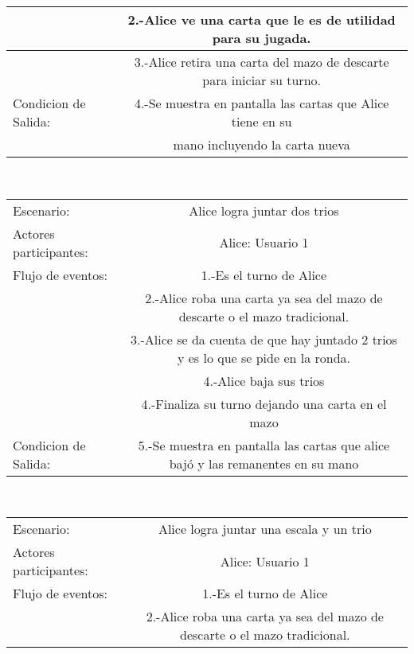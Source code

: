 \begin{center}
\begin{tabular}{ l | c  }
                                         & 2.-Alice ve una carta que le es de utilidad para su jugada. \\\hline
                                         & 3.-Alice retira una carta del mazo de descarte para iniciar su turno. \\\hline
        Condicion de Salida:             & 4.-Se muestra en pantalla las cartas que Alice tiene en su\\\hline
        &mano incluyendo la carta nueva                       \\\hline
        \hline
    \end{tabular}
    \\
    \begin{tabular}{ l | c  }
        Escenario:            & Alice logra juntar dos trios \\
        Actores participantes: & Alice: Usuario  1                                              \\\hline
        Flujo de eventos:                & 1.-Es el turno de Alice                                 \\
                                         & 2.-Alice roba una carta ya sea del mazo de descarte o el mazo tradicional.\\\hline
                                         & 3.-Alice se da cuenta de que hay juntado 2 trios y es lo que se pide en la ronda. \\\hline
                                         & 4.-Alice baja sus trios                      \\\hline
                                         & 4.-Finaliza su turno dejando una carta en el mazo             \\\hline
        Condicion de Salida:             & 5.-Se muestra en pantalla las cartas que alice bajó y las remanentes en su mano                   \\\hline
        \hline
    \end{tabular}
    \\
    \begin{tabular}{ l | c  }
        Escenario:            & Alice logra juntar una escala y un trio\\
        Actores participantes: & Alice: Usuario  1                                              \\\hline
        Flujo de eventos:                & 1.-Es el turno de Alice                                 \\
                                         & 2.-Alice roba una carta ya sea del mazo de descarte o el mazo tradicional.\\\hline

\end{tabular}
\end{center}
